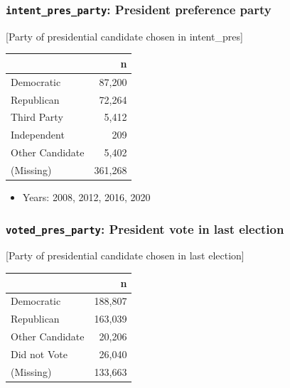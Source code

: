 \documentclass[10pt,article,oneside]{memoir}
\theoremstyle{definition}
\begin{document}
\hypertarget{intent_pres_party-president-preference-party}{%
\subsubsection{\texorpdfstring{\texttt{intent\_pres\_party}: President
preference
party}{intent\_pres\_party: President preference party}}\label{intent_pres_party-president-preference-party}}

{[}Party of presidential candidate chosen in intent\_pres{]}

\begin{table}[H]
\centering
\begin{tabular}{lr}
\toprule
 & n\\
\midrule
Democratic & 87,200\\
Republican & 72,264\\
Third Party & 5,412\\
Independent & 209\\
Other Candidate & 5,402\\
(Missing) & 361,268\\
\bottomrule
\end{tabular}
\end{table}

\begin{itemize}
\tightlist
\item
  Years: 2008, 2012, 2016, 2020
\end{itemize}

\hypertarget{voted_pres_party-president-vote-in-last-election}{%
\subsubsection{\texorpdfstring{\texttt{voted\_pres\_party}: President
vote in last
election}{voted\_pres\_party: President vote in last election}}\label{voted_pres_party-president-vote-in-last-election}}

{[}Party of presidential candidate chosen in last election{]}

\begin{table}[H]
\centering
\begin{tabular}{lr}
\toprule
 & n\\
\midrule
Democratic & 188,807\\
Republican & 163,039\\
Other Candidate & 20,206\\
Did not Vote & 26,040\\
(Missing) & 133,663\\
\bottomrule
\end{tabular}
\end{table}
\end{document}
